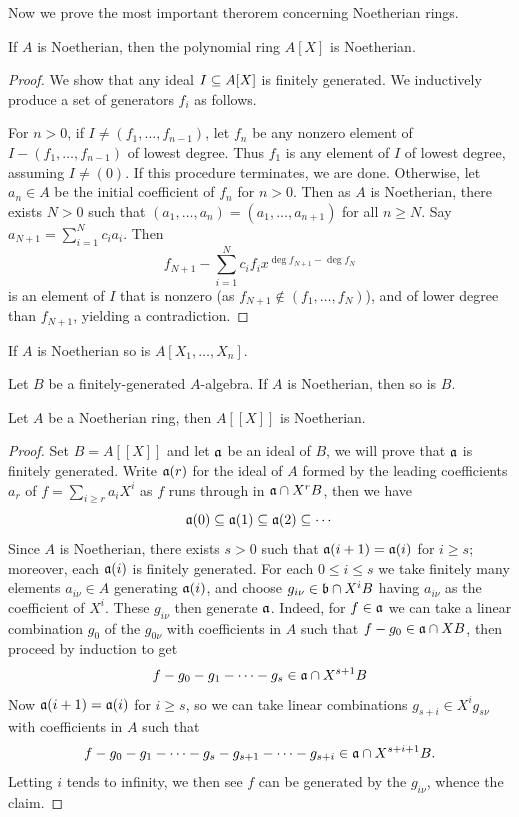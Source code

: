 Now we prove the most important therorem concerning Noetherian rings.
\begin{theorem}\label{Hilbert basis theorem}
If $A$ is Noetherian, then the polynomial ring $A[X]$ is Noetherian.
\end{theorem}
\begin{proof}
We show that any ideal $I\subseteq A[X]$ is finitely generated. We inductively produce a set of generators $f_i$ as follows.\par
For $n>0$, if $I\neq(f_1,\dots,f_{n-1})$, let $f_n$ be any nonzero element of $I-(f_1,\dots,f_{n-1})$ of lowest degree. Thus $f_1$ is any element of $I$ of lowest degree, assuming $I\neq(0)$. If this procedure terminates, we are done. Otherwise, let $a_n\in A$ be the initial coefficient of $f_n$ for $n>0$. Then as $A$ is Noetherian, there exists $N>0$ such that $(a_1,\dots,a_n)=(a_1,\dots,a_{n+1})$ for all $n\geq N$. Say $a_{N+1}=\sum_{i=1}^{N}c_ia_i$. Then
\[f_{N+1}-\sum_{i=1}^{N}c_if_ix^{\deg f_{N+1}-\deg f_N}\]
is an element of $I$ that is nonzero (as $f_{N+1}\notin(f_1,\dots,f_N)$), and of lower degree than $f_{N+1}$, yielding a contradiction.
\end{proof}
\begin{corollary}
If $A$ is Noetherian so is $A[X_1,\dots,X_n]$.
\end{corollary}
\begin{corollary}
Let $B$ be a finitely-generated $A$-algebra. If $A$ is Noetherian, then so is $B$.
\end{corollary}
\begin{proposition}
Let $A$ be a Noetherian ring, then $A[[X]]$ is Noetherian.
\end{proposition}
\begin{proof}
Set $B=A[[X]]$ and let $\mathfrak{a}$ be an ideal of $B$, we will prove that $\mathfrak{a}$ is finitely generated. Write $\mathfrak{a}(r)$ for the ideal of $A$ formed by the leading coefficients $a_r$ of $f=\sum_{i\geq r}a_iX^i$ as $f$ runs through in $\mathfrak{a}\cap X^rB$, then we have
\[\mathfrak{a}(0)\subseteq\mathfrak{a}(1)\subseteq\mathfrak{a}(2)\subseteq\cdots\]
Since $A$ is Noetherian, there exists $s>0$ such that $\mathfrak{a}(i+1)=\mathfrak{a}(i)$ for $i\geq s$; moreover, each $\mathfrak{a}(i)$ is finitely generated. For each $0\leq i\leq s$ we take finitely many elements $a_{i\nu}\in A$ generating $\mathfrak{a}(i)$, and choose $g_{i\nu}\in \mathfrak{b}\cap X^iB$ having $a_{i\nu}$ as the coefficient of $X^i$. These $g_{i\nu}$ then generate $\mathfrak{a}$. Indeed, for $f\in\mathfrak{a}$ we can take a linear combination $g_0$ of the $g_{0\nu}$ with coefficients in $A$ such that $f-g_0\in\mathfrak{a}\cap XB$, then proceed by induction to get
\[f-g_0-g_1-\cdots-g_s\in\mathfrak{a}\cap X^{s+1}B\]
Now $\mathfrak{a}(i+1)=\mathfrak{a}(i)$ for $i\geq s$, so we can take linear combinations $g_{s+i}\in X^ig_{s\nu}$ with coefficients in $A$ such that
\[f-g_0-g_1-\cdots-g_s-g_{s+1}-\cdots-g_{s+i}\in\mathfrak{a}\cap X^{s+i+1}B.\]
Letting $i$ tends to infinity, we then see $f$ can be generated by the $g_{i\nu}$, whence the claim.
\end{proof}
